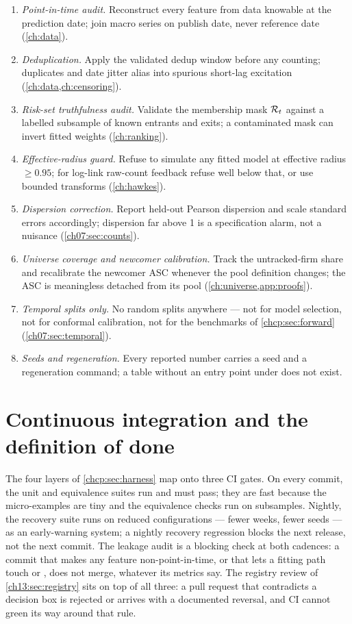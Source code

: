 \begin{enumerate}[label=C\arabic*.,leftmargin=3.0em]
\item \emph{Point-in-time audit.} Reconstruct every feature from data knowable at the prediction date; join
macro series on publish date, never reference date (\cref{ch:data}).
\item \emph{Deduplication.} Apply the validated dedup window before any counting; duplicates and date jitter
alias into spurious short-lag excitation (\cref{ch:data,ch:censoring}).
\item \emph{Risk-set truthfulness audit.} Validate the membership mask $\mathcal{R}_t$ against a labelled
subsample of known entrants and exits; a contaminated mask can invert fitted weights (\cref{ch:ranking}).
\item \emph{Effective-radius guard.} Refuse to simulate any fitted model at effective radius $\ge 0.95$; for
log-link raw-count feedback refuse well below that, or use bounded transforms (\cref{ch:hawkes}).
\item \emph{Dispersion correction.} Report held-out Pearson dispersion and scale standard errors accordingly;
dispersion far above 1 is a specification alarm, not a nuisance (\cref{ch07:sec:counts}).
\item \emph{Universe coverage and newcomer calibration.} Track the untracked-firm share and recalibrate the
newcomer ASC whenever the pool definition changes; the ASC is meaningless detached from its pool
(\cref{ch:universe,app:proofs}).
\item \emph{Temporal splits only.} No random splits anywhere --- not for model selection, not for conformal
calibration, not for the benchmarks of \cref{chcp:sec:forward} (\cref{ch07:sec:temporal}).
\item \emph{Seeds and regeneration.} Every reported number carries a seed and a regeneration command; a table
without an entry point under  does not exist.
\end{enumerate}

\section{Continuous integration and the definition of done}
\label{chcp:sec:ci}

The four layers of \cref{chcp:sec:harness} map onto three CI gates. On every commit, the unit and equivalence
suites run and must pass; they are fast because the micro-examples are tiny and the equivalence checks run on
subsamples. Nightly, the recovery suite runs on reduced configurations --- fewer weeks, fewer seeds --- as an
early-warning system; a nightly recovery regression blocks the next release, not the next commit. The leakage
audit is a blocking check at both cadences: a commit that makes any feature non-point-in-time, or that lets a
fitting path touch  or , does not merge, whatever its
metrics say. The registry review of \cref{ch13:sec:registry} sits on top of all three: a pull request that
contradicts a decision box is rejected or arrives with a documented reversal, and CI cannot green its way
around that rule.

